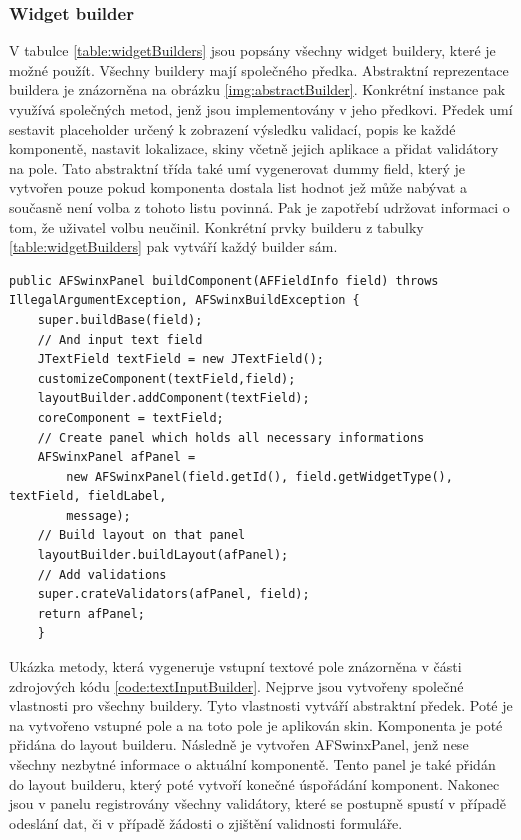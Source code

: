 \subsubsection{Widget builder}
V tabulce \ref{table:widgetBuilders} jsou popsány všechny widget buildery, které je možné použít. Všechny buildery mají společného předka. Abstraktní reprezentace buildera je znázorněna na obrázku \ref{img:abstractBuilder}. Konkrétní instance pak využívá společných metod, jenž jsou implementovány v jeho předkovi. Předek umí sestavit placeholder určený k zobrazení výsledku validací, popis ke každé komponentě, nastavit lokalizace, skiny včetně jejich aplikace a přidat validátory na pole. Tato abstraktní třída také umí vygenerovat dummy field, který je vytvořen pouze pokud komponenta dostala list hodnot jež může nabývat a současně není volba z tohoto listu povinná. Pak je zapotřebí udržovat informaci o tom, že uživatel volbu neučinil. Konkrétní prvky builderu z tabulky \ref{table:widgetBuilders} pak vytváří každý builder sám. 

\begin{lstlisting}[caption={Vytváření vstupního pole builderem.},
  label={code:textInputBuilder}]
public AFSwinxPanel buildComponent(AFFieldInfo field) throws IllegalArgumentException, AFSwinxBuildException {
	super.buildBase(field);
	// And input text field
	JTextField textField = new JTextField();
	customizeComponent(textField,field);
	layoutBuilder.addComponent(textField);
	coreComponent = textField;
	// Create panel which holds all necessary informations
	AFSwinxPanel afPanel =
		new AFSwinxPanel(field.getId(), field.getWidgetType(), textField, fieldLabel,
		message);
	// Build layout on that panel
	layoutBuilder.buildLayout(afPanel);
	// Add validations
	super.crateValidators(afPanel, field);
	return afPanel;
    }
\end{lstlisting}

Ukázka metody, která vygeneruje vstupní textové pole znázorněna v části zdrojových kódu \ref{code:textInputBuilder}. Nejprve jsou vytvořeny společné vlastnosti pro všechny buildery. Tyto vlastnosti vytváří abstraktní předek. Poté je na vytvořeno vstupné pole a na toto pole je aplikován skin. Komponenta je poté přidána do layout builderu. Následně je vytvořen AFSwinxPanel, jenž nese všechny nezbytné informace o aktuální komponentě. Tento panel je také přidán do layout builderu, který poté vytvoří konečné úspořádání komponent. Nakonec jsou v panelu registrovány všechny validátory, které se postupně spustí v případě odeslání dat, či v případě žádosti o zjištění validnosti formuláře.

